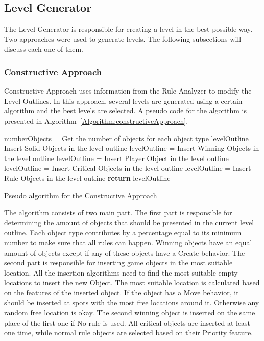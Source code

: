 \documentclass[letterpaper]{article}
\newcommand{\algref}[1]{Algorithm~\ref{Algorithm:#1}}
\begin{document}
\subsection{Level Generator}
The Level Generator is responsible for creating a level in the best possible way. Two approaches were used to generate levels. The following subsections will discuss each one of them.

\subsubsection{Constructive Approach}
Constructive Approach uses information from the Rule Analyzer to modify the Level Outlines. In this approach, several levels are generated using a certain algorithm and the best levels are selected. A pseudo code for the algorithm is presented in \algref{constructiveApproach}.\\\par

\setlength{\textfloatsep}{0pt}
\begin{algorithm}[ht]
	\BlankLine
	numberObjects = Get the number of objects for each object type\;
	\BlankLine
	levelOutline = Insert Solid Objects in the level outline\;
	levelOutline = Insert Winning Objects in the level outline\;
	levelOutline = Insert Player Object in the level outline\;
	levelOutline = Insert Critical Objects in the level outline\;
	levelOutline = Insert Rule Objects in the level outline\;
	\BlankLine
	\textbf{return} levelOutline\;
	\caption{Pseudo algorithm for the Constructive Approach}
	\label{Algorithm:constructiveApproach}
\end{algorithm}
\setlength{\textfloatsep}{10pt}

The algorithm consists of two main part. The first part is responsible for determining the amount of objects that should be presented in the current level outline. Each object type contributes by a percentage equal to its minimum number to make sure that all rules can happen. Winning objects have an equal amount of objects except if any of these objects have a Create behavior. The second part is responsible for inserting game objects in the most suitable location. All the insertion algorithms need to find the most suitable empty locations to insert the new Object. The most suitable location is calculated based on the features of the inserted object. If the object has a Move behavior, it should be inserted at spots with the most free locations around it. Otherwise any random free location is okay. The second winning object is inserted on the same place of the first one if No rule is used. All critical objects are inserted at least one time, while normal rule objects are selected based on their Priority feature.
\end{document}

